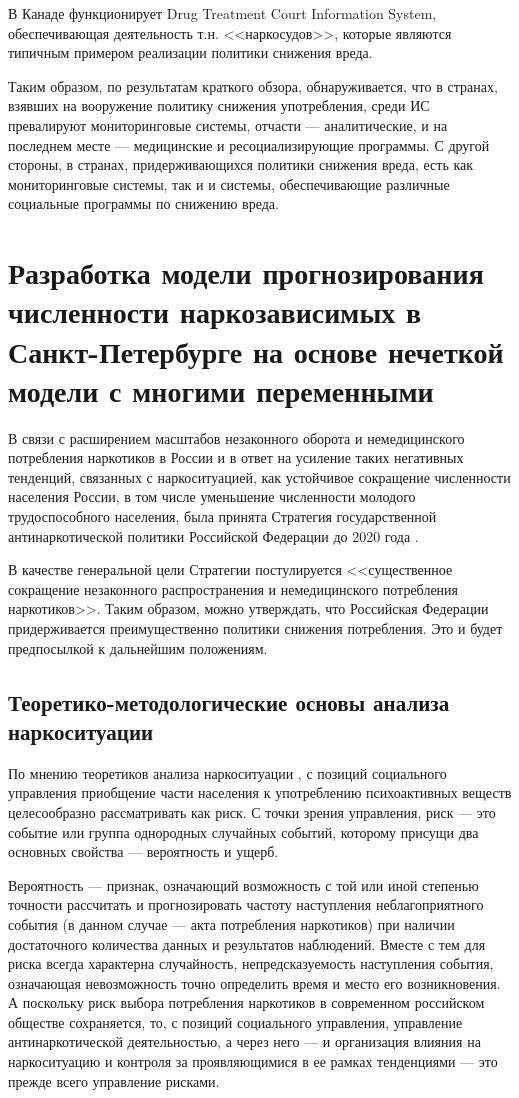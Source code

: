 \documentclass[a4paper,14pt]{article}
\begin{document}
В Канаде функционирует Drug Treatment Court Information System, обеспечивающая деятельность т.н. <<наркосудов>>, которые являются типичным примером реализации политики снижения вреда.

Таким образом, по результатам краткого обзора, обнаруживается, что в странах, взявших на вооружение политику снижения употребления, среди ИС превалируют мониторинговые системы, отчасти --- аналитические, и на последнем месте --- медицинские и ресоциализирующие программы.
С другой стороны, в странах, придерживающихся политики снижения вреда, есть как мониторинговые системы, так и и системы, обеспечивающие различные социальные программы по снижению вреда.


\section{Разработка модели прогнозирования численности наркозависимых в Санкт-Петербурге на основе нечеткой модели с многими переменными}

В связи с расширением масштабов незаконного оборота и немедицинского потребления наркотиков  в России и в ответ на усиление таких негативных тенденций, связанных с наркоситуацией, как устойчивое сокращение численности населения России, в том числе уменьшение численности молодого трудоспособного населения, была принята Стратегия государственной антинаркотической политики
Российской Федерации до 2020 года \cite{ru_nat_drug_strat}. 

В качестве генеральной цели Стратегии постулируется <<существенное сокращение незаконного распространения и немедицинского потребления наркотиков>>. Таким образом, можно утверждать, что Российская Федерации придерживается преимущественно политики снижения потребления. Это и будет предпосылкой к дальнейшим положениям.
\subsection{Теоретико-методологические основы анализа наркоситуации}
По мнению теоретиков анализа наркоситуации \cite{Karpets2010}, с позиций социального управления
приобщение части населения к употреблению психоактивных веществ целесообразно рассматривать как риск. С точки зрения управления, риск –-- это событие или группа однородных случайных событий, которому присущи два основных свойства --– вероятность и ущерб.

Вероятность –-- признак, означающий возможность с той или иной степенью точности рассчитать и прогнозировать частоту наступления неблагоприятного события (в данном случае --– акта потребления наркотиков) при наличии достаточного количества данных и результатов наблюдений. Вместе с тем для риска всегда характерна случайность, непредсказуемость
наступления события, означающая невозможность точно определить время и место его возникновения. А поскольку риск выбора потребления наркотиков в современном российском
обществе сохраняется, то, с позиций социального управления, управление антинаркотической деятельностью, а через него –-- и организация влияния на наркоситуацию и контроля за
проявляющимися в ее рамках тенденциями –-- это прежде всего управление рисками.
\end{document}
